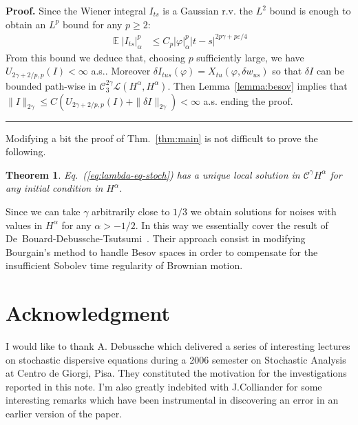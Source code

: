\documentclass[a4paper,12pt,reqno]{article}
\DeclareMathOperator{\expect}{{\mathbb E}}
\newcommand{\eps}{\varepsilon}
\newcommand{\der}{\delta}
\newcommand{\CC}{\mathcal{C}}
\newcommand{\LL}{\mathcal{L}}
\newtheorem{theorem}{Theorem}
\newenvironment{proof}[1][Proof]{\textbf{#1.} }{\ \rule{0.5em}{0.5em}}
\begin{document}
\begin{proof}
Since the Wiener integral $I_{ts}$ is a Gaussian r.v.  the $L^2$ bound is
enough to obtain an $L^p$ bound for any $p\ge 2$:
\begin{equation*}
  \begin{split}
\expect \left|I_{ts}\right|^p_\alpha &  \le C_p  |\varphi|_\alpha^p |t-s|^{2p\gamma+p \eps /4}
  \end{split}
\end{equation*}
From this bound we deduce that, choosing $p$ sufficiently large, we
have $U_{2\gamma+2/p,p}(I) < \infty$ a.s.. Moreover $\der I_{tus}(\varphi)
= X_{tu}(\varphi,\der w_{us})$ so that $\der I$ can be bounded
path-wise in $\CC_3^{2\gamma} \LL(H^{\alpha},H^{\alpha})$.  
Then Lemma~\ref{lemma:besov} implies that 
$
\|I\|_{2\gamma} \le C(U_{2\gamma+2/p,p}(I)+\|\der I\|_{2\gamma}) < \infty
$ a.s.
ending the proof.
\end{proof}

Modifying a bit the proof of Thm.~\ref{thm:main} is not
difficult to prove the following.

\begin{theorem}
\label{th:eq-stoch}
Eq.~(\ref{eq:lambda-eq-stoch}) has a unique local solution in $\CC^\gamma H^\alpha$ for any initial
condition in $H^\alpha$.  
\end{theorem}

Since we can take $\gamma$ arbitrarily close to $1/3$ we obtain
solutions for noises with values in $H^\alpha$ for any  $\alpha > -1/2$.
In this way we essentially cover the result of
De~Bouard-Debussche-Tsutsumi~\cite{MR2111917}. Their approach consist
in modifying Bourgain's method to handle  Besov spaces in order to compensate
for the insufficient  Sobolev time regularity of Brownian motion.


\section*{Acknowledgment}
I would like to thank A. Debussche which  delivered a series of interesting
lectures on stochastic dispersive equations  during a 2006
semester on Stochastic Analysis at Centro de Giorgi, Pisa. They
constituted the motivation for the investigations reported in this
note. I'm also greatly indebited with J.Colliander for  some
interesting remarks which have been instrumental in  discovering an error in  an earlier version of the
paper.  

\end{document}
